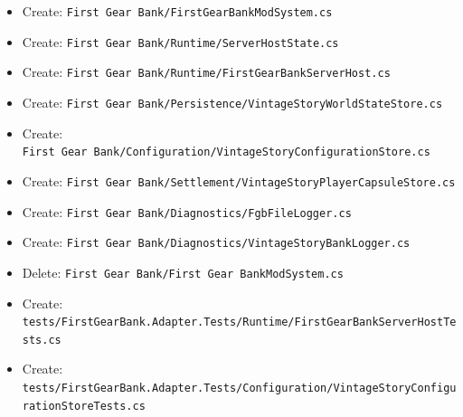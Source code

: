 \documentclass[
  10pt,
  letterpaper,
]{article}
\providecommand{\tightlist}{%
  \setlength{\itemsep}{0pt}\setlength{\parskip}{0pt}}
\begin{document}
\begin{itemize}
\tightlist
\item
  Create:
  \texttt{First\ }\allowbreak{}\texttt{Gear\ }\allowbreak{}\texttt{Bank/}\allowbreak{}\texttt{FirstGearBankModSystem.}\allowbreak{}\texttt{cs}
\item
  Create:
  \texttt{First\ }\allowbreak{}\texttt{Gear\ }\allowbreak{}\texttt{Bank/}\allowbreak{}\texttt{Runtime/}\allowbreak{}\texttt{ServerHostState.}\allowbreak{}\texttt{cs}
\item
  Create:
  \texttt{First\ }\allowbreak{}\texttt{Gear\ }\allowbreak{}\texttt{Bank/}\allowbreak{}\texttt{Runtime/}\allowbreak{}\texttt{FirstGearBankServerHost.}\allowbreak{}\texttt{cs}
\item
  Create:
  \texttt{First\ }\allowbreak{}\texttt{Gear\ }\allowbreak{}\texttt{Bank/}\allowbreak{}\texttt{Persistence/}\allowbreak{}\texttt{VintageStoryWorldStateStore.}\allowbreak{}\texttt{cs}
\item
  Create:
  \texttt{First\ }\allowbreak{}\texttt{Gear\ }\allowbreak{}\texttt{Bank/}\allowbreak{}\texttt{Configuration/}\allowbreak{}\texttt{VintageStoryConfigurationStore.}\allowbreak{}\texttt{cs}
\item
  Create:
  \texttt{First\ }\allowbreak{}\texttt{Gear\ }\allowbreak{}\texttt{Bank/}\allowbreak{}\texttt{Settlement/}\allowbreak{}\texttt{VintageStoryPlayerCapsuleStore.}\allowbreak{}\texttt{cs}
\item
  Create:
  \texttt{First\ }\allowbreak{}\texttt{Gear\ }\allowbreak{}\texttt{Bank/}\allowbreak{}\texttt{Diagnostics/}\allowbreak{}\texttt{FgbFileLogger.}\allowbreak{}\texttt{cs}
\item
  Create:
  \texttt{First\ }\allowbreak{}\texttt{Gear\ }\allowbreak{}\texttt{Bank/}\allowbreak{}\texttt{Diagnostics/}\allowbreak{}\texttt{VintageStoryBankLogger.}\allowbreak{}\texttt{cs}
\item
  Delete:
  \texttt{First\ }\allowbreak{}\texttt{Gear\ }\allowbreak{}\texttt{Bank/}\allowbreak{}\texttt{First\ }\allowbreak{}\texttt{Gear\ }\allowbreak{}\texttt{BankModSystem.}\allowbreak{}\texttt{cs}
\item
  Create:
  \texttt{tests/}\allowbreak{}\texttt{FirstGearBank.}\allowbreak{}\texttt{Adapter.}\allowbreak{}\texttt{Tests/}\allowbreak{}\texttt{Runtime/}\allowbreak{}\texttt{FirstGearBankServerHostTests.}\allowbreak{}\texttt{cs}
\item
  Create:
  \texttt{tests/}\allowbreak{}\texttt{FirstGearBank.}\allowbreak{}\texttt{Adapter.}\allowbreak{}\texttt{Tests/}\allowbreak{}\texttt{Configuration/}\allowbreak{}\texttt{VintageStoryConfigurationStoreTests.}\allowbreak{}\texttt{cs}

\end{itemize}
\end{document}
